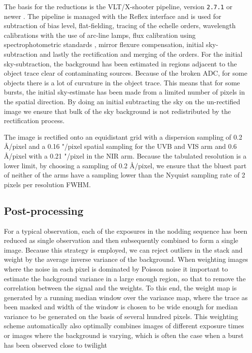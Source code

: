\documentclass{aa}    %
\begin{document}
The basis for the reductions is the VLT/X-shooter pipeline, version
\texttt{2.7.1} or newer \citep{Goldoni2006, Modigliani2010}. The pipeline is
managed with the Reflex interface \citep{Freudling2013} and is used for
subtraction of bias level, flat-fielding, tracing of the echelle orders,
wavelength calibrations with the use of arc-line lamps, flux calibration using
spectrophotometric standards \citep{Vernet2010, Hamuy1994}, mirror flexure
compensation, initial sky-subtraction and lastly the rectification and merging
of the orders. For the initial sky-subtraction, the background has been
estimated in regions adjacent to the object trace clear of contaminating
sources. Because of the broken ADC, for some objects there is a lot of curvature
in the object trace. This means that for some bursts, the initial sky-estimate
has been made from a limited number of pixels in the spatial direction. By doing
an initial subtracting the sky on the un-rectified image we ensure that bulk of
the sky background is not redistributed by the rectification process.

The image is rectified onto an equidistant grid with a dispersion sampling of
0.2 \AA/pixel and a 0.16 "/pixel spatial sampling for the UVB and VIS arm and
0.6 \AA/pixel with a 0.21 "/pixel in the NIR arm.  Because the tabulated
resolution is a lower limit, by choosing a sampling of 0.2 \AA/pixel, we ensure
that the bluest part of neither of the arms have a sampling lower than the
Nyquist sampling rate of 2 pixels per resolution FWHM.

\subsection{Post-processing} \label{postproc}

For a typical observation, each of the exposures in the nodding sequence has
been reduced as single observation and then subsequently combined to form a
single image. Because this strategy is employed, we can reject outliers in the
stack and weight by the average inverse variance of the background. When
weighting images where the noise in each pixel is dominated by Poisson noise it
important to estimate the background variance in a large enough region, so that
to remove the correlation between the signal and the weights. To this end, the
weight map is generated by a running median window over the variance map, where
the trace as been masked and width of the window is chosen to be wide enough for
median variance to be generated on the basis of several hundred pixels. This
weighting scheme automatically also optimally combines images of different
exposure times or images where the background is varying, which is often the
case when a burst has been observed close to twilight
\end{document}
